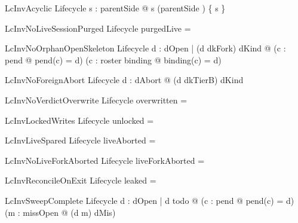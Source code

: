 \documentclass[a4paper,10pt,fleqn]{article}
\begin{document}
\begin{schema}{LcInvAcyclic}
Lifecycle
\where
\forall s : \dom parentSide @ s \notin (parentSide \plus) \limg \{ s \} \rimg
\end{schema}

\begin{schema}{LcInvNoLiveSessionPurged}
Lifecycle
\where
purgedLive = \emptyset
\end{schema}

\begin{schema}{LcInvNoOrphanOpenSkeleton}
Lifecycle
\where
\forall d : dOpen | (d \mapsto dkFork) \in dKind @ (\exists c : \dom pend @ pend(c) = d) \lor (\exists c : roster \cap \dom binding @ binding(c) = d)
\end{schema}

\begin{schema}{LcInvNoForeignAbort}
Lifecycle
\where
\forall d : dAbort @ (d \mapsto dkTierB) \notin dKind
\end{schema}

\begin{schema}{LcInvNoVerdictOverwrite}
Lifecycle
\where
overwritten = \emptyset
\end{schema}

\begin{schema}{LcInvLockedWrites}
Lifecycle
\where
unlocked = \emptyset
\end{schema}

\begin{schema}{LcInvLiveSpared}
Lifecycle
\where
liveAborted = \emptyset
\end{schema}

\begin{schema}{LcInvNoLiveForkAborted}
Lifecycle
\where
liveForkAborted = \emptyset
\end{schema}

\begin{schema}{LcInvReconcileOnExit}
Lifecycle
\where
leaked = \emptyset
\end{schema}

\begin{schema}{LcInvSweepComplete}
Lifecycle
\where
\forall d : dOpen | d \notin todo @ (\exists c : \dom pend @ pend(c) = d) \lor (\exists m : missOpen @ (d \mapsto m) \in dMis)
\end{schema}
\end{document}

